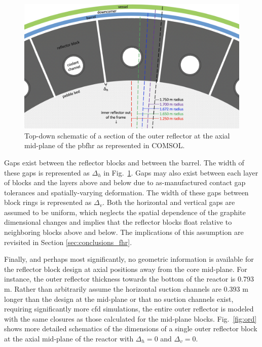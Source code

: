 \begin{figure}[h!]
\centering
\includegraphics[width=0.8\linewidth]{figs/pbfhr_or.png}
\caption{Top-down schematic of a section of the outer reflector at the axial mid-plane of the \gls{pbfhr} as represented in COMSOL.}
\label{fig:orh}
\end{figure}

Gaps exist between the reflector blocks and between the barrel. The width of these gaps is represented as \(\Delta_h\) in Fig.\ \ref{fig:orh}. Gaps may also exist between each layer of blocks and the layers above and below due to as-manufactured contact gap tolerances and spatially-varying deformation. The width of these gaps between block rings is represented as \(\Delta_v\). Both the horizontal and vertical gaps are assumed to be uniform, which neglects the spatial dependence of the graphite dimensional changes and implies that the reflector blocks float relative to neighboring blocks above and below. The implications of this assumption are revisited in Section \ref{sec:conclusions_fhr}.

Finally, and perhaps most significantly, no geometric information is available for the reflector block design at axial positions away from the core mid-plane. For instance, the outer reflector thickness towards the bottom of the reactor is 0.793 \si{\meter}. Rather than arbitrarily assume the horizontal suction channels are 0.393 \si{\meter} longer than the design at the mid-plane or that no suction channels exist, requiring significantly more \gls{cfd} simulations, the entire outer reflector is modeled with the same closures as those calculated for the mid-plane blocks. Fig.\ \ref{fig:ord} shows more detailed schematics of the dimensions of a single outer reflector block at the axial mid-plane of the reactor with \(\Delta_h=0\) and \(\Delta_v=0\). 

